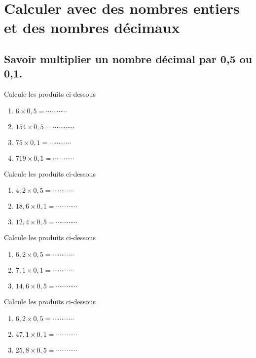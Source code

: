\section{Calculer avec des nombres entiers et des nombres décimaux}



\subsection{Savoir multiplier un nombre décimal par 0,5 ou 0,1.}


Calcule les produits ci-dessous
\begin{enumerate}
 \item $6 \times 0,5 = \cdots\cdots\cdots\cdots$  
 \item $154 \times 0,5 = \cdots\cdots\cdots\cdots$ 
 \item $75 \times 0,1 = \cdots\cdots\cdots\cdots$
 \item $719 \times 0,1 = \cdots\cdots\cdots\cdots$
\end{enumerate}




Calcule les produits ci-dessous
\begin{enumerate}
 \item $4,2 \times 0,5 = \cdots\cdots\cdots\cdots$ 
 \item $18,6 \times 0,1 = \cdots\cdots\cdots\cdots$ 
 \item $12,4 \times 0,5 = \cdots\cdots\cdots\cdots$  
\end{enumerate}




Calcule les produits ci-dessous
\begin{enumerate}
 \item $6,2 \times 0,5 = \cdots\cdots\cdots\cdots$ 
 \item $7,1 \times 0,1 = \cdots\cdots\cdots\cdots$ 
 \item $14,6 \times 0,5 = \cdots\cdots\cdots\cdots$  
\end{enumerate}




Calcule les produits ci-dessous
\begin{enumerate}
 \item $6,2 \times 0,5 = \cdots\cdots\cdots\cdots$ 
 \item $47,1 \times 0,1 = \cdots\cdots\cdots\cdots$ 
 \item $25,8 \times 0,5 = \cdots\cdots\cdots\cdots$  
\end{enumerate}




